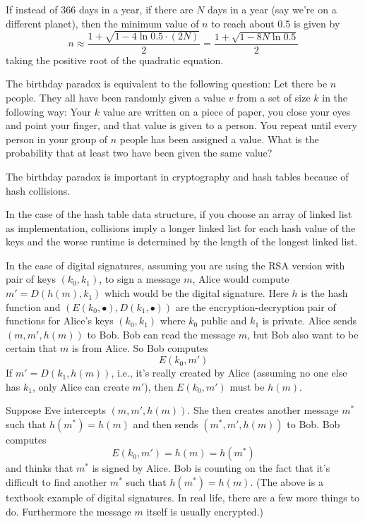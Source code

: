 If instead of 366 days in a year,
if there are $N$ days in a year (say we're on a different planet),
then the minimum value of $n$ to reach about 0.5 is given by
\[
n \approx 
\frac{1 + \sqrt{1 - 4 \ln 0.5 \cdot (2N)}}{2} 
=\frac{1 + \sqrt{1 - 8N \ln 0.5}}{2} 
\]
taking the positive root of the quadratic equation.





The birthday paradox is equivalent to the following
question:
Let there be $n$ people.
They all have been randomly given a value $v$ from
a set of size $k$ in the following way:
Your $k$ value are written on a piece of paper,
you close your eyes and point your finger, and that value is given to a person.
You repeat until every person in your group of $n$ people has been assigned a value.
What is the probability that at least two have been given the same value?


The birthday paradox is important in
cryptography and hash tables because of hash collisions.

In the case of the hash table data structure,
if you choose an array of linked list as implementation,
collisions imply a longer linked list for each hash value of the keys
and the worse runtime is determined by the length of the longest
linked list.

In the case of digital signatures,
assuming you are using the RSA version with pair of keys $(k_0, k_1)$,
to sign a message $m$, Alice would compute $m' = D(h(m), k_1)$
which would be the digital signature.
Here $h$ is the hash function and
$(E(k_0, \bullet), D(k_1, \bullet))$ are the encryption-decryption pair of functions
for Alice's keys $(k_0, k_1)$ where $k_0$ public and $k_1$ is private.
Alice sends $(m, m', h(m))$ to Bob.
Bob can read the message $m$,
but Bob also want to be certain that $m$ is from Alice.
So Bob computes
\[
  E(k_0, m')
\]
If $m' = D(k_1, h(m))$, i.e., it's really created by Alice (assuming no one else has $k_1$,
only Alice can create $m'$), then
$E(k_0, m')$ must be $h(m)$.

Suppose Eve intercepts $(m, m', h(m))$.
She then creates
another message $m^*$ such that
$h(m^*) = h(m)$
and then sends $(m^*, m', h(m))$ to Bob.
Bob computes
\[
  E(k_0, m') = h(m) = h(m^*)
\]
and thinks that $m^*$ is signed by Alice.
Bob is counting on the fact that it's difficult to find another
$m^*$ such that $h(m^*) = h(m)$.
(The above is a textbook example of digital signatures.
In real life, there are a few more things to do.
Furthermore the
message $m$ itself is usually
encrypted.)

